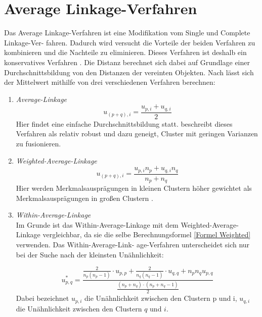 \section{Average Linkage-Verfahren}
Das Average Linkage-Verfahren ist eine Modifikation vom Single und Complete Linkage-Ver- \linebreak fahren. Dadurch wird versucht die Vorteile der beiden Verfahren zu kombinieren und die Nachteile zu eliminieren. Dieses Verfahren ist deshalb ein konservatives Verfahren \citep[Vgl.][S. 264-266]{Bacher.2010}. Die Distanz berechnet sich dabei auf Grundlage einer Durchschnittsbildung von den Distanzen der vereinten Objekten.
Nach \citet[S. 264]{Bacher.2010} lässt sich der Mittelwert mithilfe von drei verschiedenen Verfahren berechnen:
\begin{enumerate}
	\item \textit{Average-Linkage} \\
	\begin{equation}
		u_{(p+q),i} = \frac{u_{p,i} + u_{q,i}}{2}
	\end{equation}
	Hier findet eine einfache Durchschnittsbildung statt. \citet[S. 79]{Everitt.2011} beschreibt dieses Verfahren als relativ robust und dazu geneigt, Cluster mit geringen Varianzen zu fusionieren.
	\item \textit{Weighted-Average-Linkage} \\
	\begin{equation}
		u_{(p+q),i} = \frac{u_{p,i}n_{p} + u_{q,i}n_{q}}{n_{p} + n_{q}}
		\label{Formel Weighted}
	\end{equation}
	Hier werden Merkmalsausprägungen in kleinen Clustern höher gewichtet als Merkmalsausprägungen in großen Clustern \citep[Vgl.][S. 79]{Everitt.2011}.
	\item \textit{Within-Average-Linkage} \\
	Im Grunde ist das Within-Average-Linkage mit dem Weighted-Average-Linkage vergleichbar, da sie die selbe Berechnungsformel \ref{Formel Weighted} verwenden. Das Within-Average-Link- \linebreak age-Verfahren unterscheidet sich nur bei der Suche nach der kleinsten Unähnlichkeit: 
	
	\begin{equation}
	u_{p,q}^* = \frac{
					\frac{2}{n_p(n_p-1)}
					\cdot u_{p,p}+
					\frac{2}{n_q(n_q-1)}
					\cdot u_{q,q}+n_pn_qu_{p,q}
				}
				{
				\frac{(n_p+n_q)\cdot(n_p+n_q-1)}{2}
				}
	\end{equation}
	Dabei bezeichnet $u_{p,i}$ die Unähnlichkeit zwischen den Clustern p und i, $u_{q,i}$ die Unähnlichkeit zwischen den Clustern $q$ und $i$.
\end{enumerate} 


